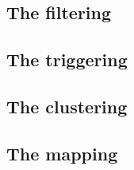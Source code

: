 \subsection{The filtering} \label{sec:algorithm:conditioning}

\subsection{The triggering} \label{sec:algorithm:triggering}

\subsection{The clustering} \label{sec:algorithm:conditioning}

\subsection{The mapping} \label{sec:algorithm:mapping}
